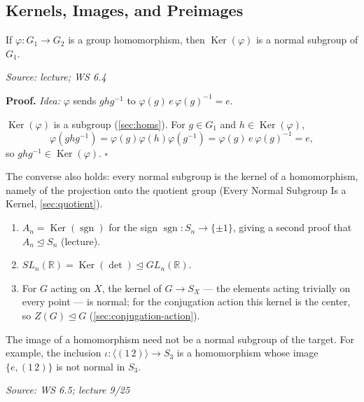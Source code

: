 \documentclass[11pt]{report}
\newcommand{\sgn}{\operatorname{sgn}}
\renewenvironment{proof}[1][Proof]{\noindent\textbf{#1.} }{\hfill$\square$\par\vspace{5pt}}
\newcommand{\srcline}[1]{\par\hfill{\footnotesize\textit{Source: #1}}}
\begin{document}
\subsection{Kernels, Images, and Preimages}

\begin{propbox}\label{prop:kernels-normal}
If $\varphi: G_1 \to G_2$ is a group homomorphism, then $\operatorname{Ker}(\varphi)$ is a normal subgroup of $G_1$.
\srcline{lecture; WS 6.4}
\end{propbox}

\begin{proof}
\textit{Idea:} $\varphi$ sends $ghg^{-1}$ to $\varphi(g)\,e\,\varphi(g)^{-1} = e$.\par
$\operatorname{Ker}(\varphi)$ is a subgroup (\ref{sec:homs}). For $g \in G_1$ and $h \in \operatorname{Ker}(\varphi)$,
\[ \varphi(ghg^{-1}) = \varphi(g)\varphi(h)\varphi(g^{-1}) = \varphi(g)\,e\,\varphi(g)^{-1} = e, \]
so $ghg^{-1} \in \operatorname{Ker}(\varphi)$.
\end{proof}

The converse also holds: every normal subgroup is the kernel of a homomorphism, namely of the projection onto the quotient group (Every Normal Subgroup Is a Kernel, \ref{sec:quotient}).


\begin{exbox}[Kernels]\label{ex:kernels}
\begin{enumerate}[nosep]
    \item $A_n = \operatorname{Ker}(\sgn)$ for the sign $\sgn: S_n \to \{\pm 1\}$, giving a second proof that $A_n \trianglelefteq S_n$ (lecture).
    \item $SL_n(\mathbb{R}) = \operatorname{Ker}(\det) \trianglelefteq GL_n(\mathbb{R})$.
    \item For $G$ acting on $X$, the kernel of $G \to S_X$ --- the elements acting trivially on every point --- is normal; for the conjugation action this kernel is the center, so $Z(G) \trianglelefteq G$ (\ref{sec:conjugation-action}).
\end{enumerate}
\end{exbox}

\begin{propbox}\label{prop:images-need-not-normal}
The image of a homomorphism need not be a normal subgroup of the target. For example, the inclusion $\iota: \langle (1\,2) \rangle \to S_3$ is a homomorphism whose image $\{e, (1\,2)\}$ is not normal in $S_3$.
\srcline{WS 6.5; lecture 9/25}
\end{propbox}
\end{document}
